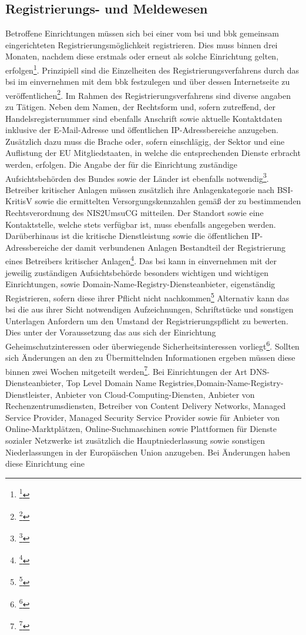 \documentclass[11pt,a4paper,hidelinks]{article}   %
\begin{document}
        \subsection{Registrierungs- und Meldewesen}
        Betroffene Einrichtungen müssen sich bei einer vom \gls{bsi} und \gls{bbk} gemeinsam eingerichteten Registrierungsmöglichkeit registrieren. Dies muss binnen drei Monaten, nachdem diese erstmals oder erneut als solche Einrichtung gelten, erfolgen\footnote{\footcite[Vgl. §33, Absatz 1,][]{NIS2UmsuCG}}. Prinzipiell sind die Einzelheiten des Registrierungsverfahrens durch das \gls{bsi} im einvernehmen mit dem \gls{bbk} festzulegen und über dessen Internetseite zu veröffentlichen\footnote{\footcite[Vgl. §33, Absatz 6,][]{NIS2UmsuCG}}. Im Rahmen des Registrierungsverfahrens sind diverse angaben zu Tätigen. Neben dem Namen, der Rechtsform und, sofern zutreffend, der Handelsregisternummer sind ebenfalls Anschrift sowie aktuelle Kontaktdaten inklusive der E-Mail-Adresse und öffentlichen IP-Adressbereiche anzugeben. Zusätzlich dazu muss die Brache oder, sofern einschlägig, der Sektor und eine Auflistung der EU Mitgliedstaaten, in welche die entsprechenden Dienste erbracht werden, erfolgen. Die Angabe der für die Einrichtung zuständige Aufsichtsbehörden des Bundes sowie der Länder ist ebenfalls notwendig\footnote{\footcite[Vgl. §33, Absatz 1,][]{NIS2UmsuCG}}. Betreiber kritischer Anlagen müssen zusätzlich ihre Anlagenkategorie nach BSI-KritisV sowie die ermittelten Versorgungskennzahlen gemäß der zu bestimmenden Rechtsverordnung des NIS2UmsuCG mitteilen. Der Standort sowie eine Kontaktstelle, welche stets verfügbar ist, muss ebenfalls angegeben werden. Darüberhinaus ist die kritische Dienstleistung sowie die öffentlichen IP-Adressbereiche der damit verbundenen Anlagen Bestandteil der Registrierung eines Betreibers kritischer Anlagen\footnote{\footcite[Vgl. §33, Absatz 1,][]{NIS2UmsuCG}}. Das \gls{bsi} kann in einvernehmen mit der jeweilig zuständigen Aufsichtsbehörde besonders wichtigen und wichtigen Einrichtungen, sowie Domain-Name-Registry-Diensteanbieter, eigenständig Registrieren, sofern diese ihrer Pflicht nicht nachkommen\footnote{\footcite[Vgl. §33, Absatz 3,][]{NIS2UmsuCG}} Alternativ kann das \gls{bsi} die aus ihrer Sicht notwendigen Aufzeichnungen, Schriftstücke und sonstigen Unterlagen Anfordern um den Umstand der Registrierungspflicht zu bewerten. Dies unter der Voraussetzung das aus sich der Einrichtung Geheimschutzinteressen oder überwiegende Sicherheitsinteressen vorliegt\footnote{\footcite[Vgl. §33, Absatz 4,][]{NIS2UmsuCG}}. Sollten sich Änderungen an den zu Übermittelnden Informationen ergeben müssen diese binnen zwei Wochen mitgeteilt werden\footnote{\footcite[Vgl. §33, Absatz 5,][]{NIS2UmsuCG}}. Bei Einrichtungen der Art DNS-Diensteanbieter, Top Level Domain Name Registries,Domain-Name-Registry-Dienstleister, Anbieter von Cloud-Computing-Diensten, Anbieter von Rechenzentrumsdiensten, Betreiber von Content Delivery Networks, Managed Service Provider, Managed Security Service Provider sowie für Anbieter von Online-Marktplätzen, Online-Suchmaschinen sowie Plattformen für Dienste sozialer Netzwerke ist zusätzlich die Hauptniederlassung sowie sonstigen Niederlassungen in der Europäischen Union anzugeben. Bei Änderungen haben diese Einrichtung eine 
\end{document}
